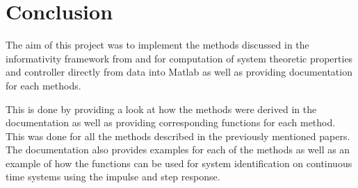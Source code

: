 \section{Conclusion}
The aim of this project was to implement the methods discussed in the informativity framework from \cite{waarde2019data} and \cite{waarde2020noisy} for computation of system theoretic properties and controller directly from data into Matlab as well as providing documentation for each methods.

This is done by providing a look at how the methods were derived in the documentation as well as providing corresponding functions for each method. This was done for all the methods described in the previously mentioned papers. The documentation also provides examples for each of the methods as well as an example of how the functions can be used for system identification on continuous time systems using the impulse and step response. 
